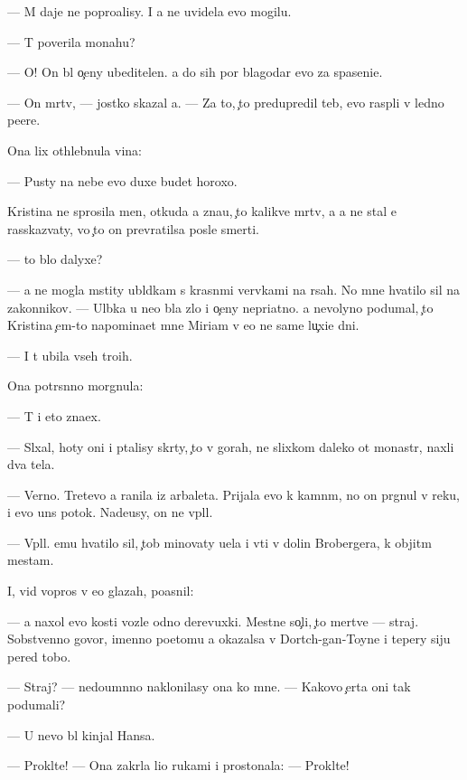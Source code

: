 \documentclass[10pt]{book}
\begin{document}
— M{\yi} daje ne popro{\x}alisy. I {\y}a ne uvidela {\y}evo mogilu.

— T{\yi} poverila monahu?

— O! On b{\yi}l o{\c}eny ubeditelen. {\Y}a do sih por blagodar{\iu} {\y}evo za spaseni{\y}e.

— On m{\e}rtv, — jostko skazal {\y}a. — Za to, {\c}to predupredil teb{\ia}, {\y}evo rasp{\ia}li v led{\ia}no{\y} pe{\x}ere.

Ona lix othlebnula vina:

— Pusty na nebe {\y}evo duxe budet horoxo.

Kristina ne sprosila men{\ia}, otkuda {\y}a zna{\y}u, {\c}to kalikve{\q} m{\e}rtv, a {\y}a ne stal {\y}e{\y} rasskaz{\yi}vaty, vo {\c}to on prevratilsa posle smerti.

— {\C}to b{\yi}lo dalyxe?

— {\Y}a ne mogla mstity ubl{\iu}dkam s krasn{\yi}mi ver{\e}vkami na r{\ia}sah. No mne hvatilo sil na zakonnikov. — Ul{\yi}bka u ne{\y}o b{\yi}la zlo{\y} i o{\c}eny nepri{\y}atno{\y}. {\Y}a nevolyno podumal, {\c}to Kristina {\c}em-to napomina{\y}et mne Miriam v {\y}e{\y}o ne sam{\yi}{\y}e lu{\c}xi{\y}e dni.

— I t{\yi} ubila vseh tro{\y}ih.

Ona potr{\ia}s{\e}nno morgnula:

— T{\yi} i eto zna{\y}ex.

— Sl{\yi}xal, hoty oni i p{\yi}talisy skr{\yi}ty, {\c}to v gorah, ne slixkom daleko ot monast{\yi}r{\ia}, naxli dva tela.

— Verno. Tret{\y}evo {\y}a ranila iz arbaleta. Prijala {\y}evo k kamn{\ia}m, no on pr{\yi}gnul v reku, i {\y}evo un{\e}s potok. Nade{\y}usy, on ne v{\yi}pl{\yi}l.

— V{\yi}pl{\yi}l. {\Y}emu hvatilo sil, {\c}tob{\yi} minovaty u{\x}el{\y}a i v{\yi}{\y}ti v dolin{\yi} Brobergera, k objit{\yi}m mestam.

I, vid{\ia} vopros v {\y}e{\y}o glazah, po{\y}asnil:

— {\Y}a naxol {\y}evo kosti vozle odno{\y} derevuxki. Mestn{\yi}{\y}e so{\c}li, {\c}to mertve{\q} — straj. Sobstvenno govor{\ia}, imenno poetomu {\y}a okazalsa v Dortch-gan-Toyne i tepery siju pered tobo{\y}.

— Straj? — nedoum{\e}nno naklonilasy ona ko mne. — Kakovo {\c}erta oni tak podumali?

— U nevo b{\yi}l kinjal Hansa.

— Prokl{\ia}t{\y}e! — Ona zakr{\yi}la li{\q}o rukami i prostonala: — Prokl{\ia}t{\y}e!
\end{document}
